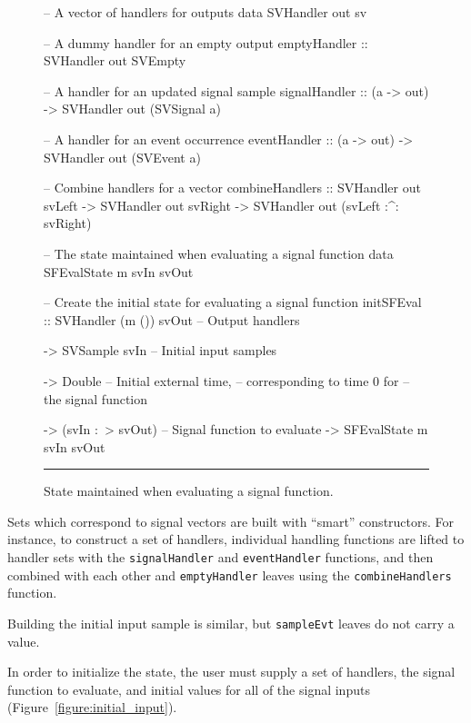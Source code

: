 \documentclass[draft]{llncs}
\begin{document}
\begin{figure}
\begin{code}
-- A vector of handlers for outputs
data SVHandler out sv

-- A dummy handler for an empty output
emptyHandler    :: SVHandler out SVEmpty

-- A handler for an updated signal sample
signalHandler   :: (a -> out) -> SVHandler out (SVSignal a)

-- A handler for an event occurrence
eventHandler    :: (a -> out) -> SVHandler out (SVEvent a)

-- Combine handlers for a vector
combineHandlers ::    SVHandler out svLeft
                   -> SVHandler out svRight
                   -> SVHandler out (svLeft :^: svRight)

-- The state maintained when evaluating a signal function
data SFEvalState m svIn svOut

-- Create the initial state for evaluating a signal function
initSFEval ::    SVHandler (m ()) svOut   -- Output handlers

              -> SVSample svIn            -- Initial input samples
              
              -> Double                   -- Initial external time,
                                          -- corresponding to time 0 for
                                          -- the signal function
                                          
              -> (svIn :~> svOut)         -- Signal function to evaluate
              -> SFEvalState m svIn svOut
\end{code}
\hrule
\caption{State maintained when evaluating a signal function.}
\label{figure:evaluation_state}
\end{figure}

Sets which correspond to signal vectors are built with ``smart'' constructors.
For instance, to construct a set of handlers, individual handling functions are
lifted to handler sets with the {\tt signalHandler} and {\tt eventHandler}
functions, and then combined with each other and {\tt emptyHandler} leaves
using the {\tt combineHandlers} function.

Building the initial input sample is similar, but {\tt sampleEvt} leaves do
not carry a value.

In order to initialize the state, the user must supply a set of handlers, the
signal function to evaluate, and initial values for all of the signal inputs
(Figure~\ref{figure:initial_input}).
\end{document}
